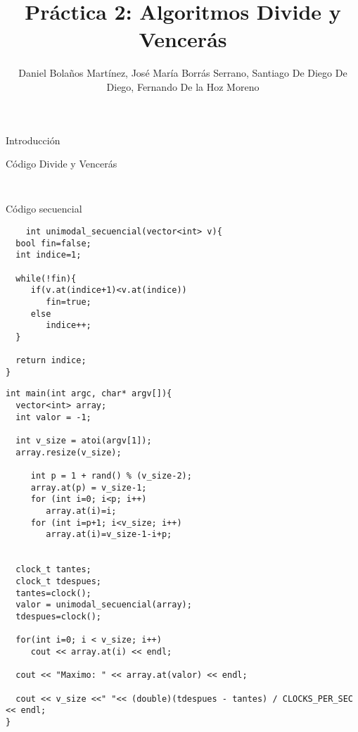 \documentclass[12pt]{beamer}
\author{Daniel Bolaños Martínez, José María Borrás Serrano, Santiago De Diego De Diego, Fernando De la Hoz Moreno}
\title{Práctica 2: Algoritmos Divide y Vencerás}
\institute{ETSIIT}
\date{}
\begin{document}
\begin{frame}
\titlepage
\end{frame}

\begin{frame}
\tableofcontents
\end{frame}

\begin{frame}{Introducción}

\end{frame}

\begin{frame}[fragile]{Código Divide y Vencerás}
	\lstset{language=C, breaklines=true, basicstyle=\footnotesize}
	\begin{lstlisting}
	
	\end{lstlisting}
\end{frame}

\begin{frame}[fragile]{Código secuencial}
	\begin{block}
		\lstset{language=C, breaklines=true, basicstyle=\footnotesize}
	\begin{lstlisting}
	int unimodal_secuencial(vector<int> v){
  bool fin=false;
  int indice=1;

  while(!fin){
     if(v.at(indice+1)<v.at(indice))
        fin=true;
     else
        indice++;
  }
  
  return indice;
}
	\end{lstlisting}
	\end{block}

\begin{block}
		\lstset{language=C, breaklines=true, basicstyle=\footnotesize}
	\begin{lstlisting}
int main(int argc, char* argv[]){
  vector<int> array;
  int valor = -1;
 
  int v_size = atoi(argv[1]);
  array.resize(v_size);

     int p = 1 + rand() % (v_size-2);
     array.at(p) = v_size-1;
     for (int i=0; i<p; i++) 
        array.at(i)=i;
     for (int i=p+1; i<v_size; i++) 
        array.at(i)=v_size-1-i+p;


  clock_t tantes;
  clock_t tdespues;
  tantes=clock();
  valor = unimodal_secuencial(array);
  tdespues=clock();

  for(int i=0; i < v_size; i++)
     cout << array.at(i) << endl;

  cout << "Maximo: " << array.at(valor) << endl;

  cout << v_size <<" "<< (double)(tdespues - tantes) / CLOCKS_PER_SEC << endl;
}
	\end{lstlisting}
	\end{block}

\end{frame}
\end{document}
